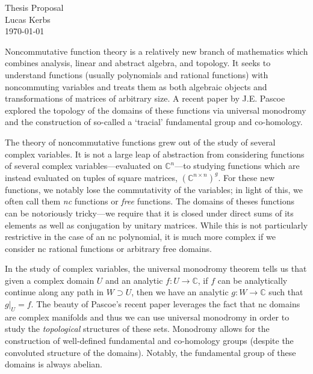 \documentclass[11pt]{exam}
\newcommand{\CC}{\mathbb{C}}
\begin{document}
\begin{center} {\LARGE Thesis Proposal \vspace{2mm}}\\ Lucas Kerbs \\ \today \end{center}

Noncommutative function theory is a relatively new branch of mathematics which
combines analysis, linear and abstract algebra, and topology. It
seeks to understand functions (usually polynomials and rational functions) with
noncommuting variables and treats them as both algebraic objects and transformations
of matrices of arbitrary size. A recent paper by J.E. Pascoe explored the
topology of the domains of these functions via universal monodromy and the
construction of so-called a `tracial' fundamental group and co-homology.

The theory of noncommutative functions grew out of the study of several complex
variables. It is not a large leap of abstraction from considering functions of
several complex variables---evaluated on \(\CC ^n\)---to studying functions
which are instead evaluated on tuples of square matrices,
\(\left(\CC ^{n\times n}\right)^g\). For these new functions, we notably lose the
commutativity of the variables; in light of this, we often call them \emph{nc}
functions or \emph{free} functions. The domains of theses functions can be
notoriously tricky---we require that it is closed under direct sums of its
elements as well as conjugation by unitary matrices. While this is not
particularly restrictive in the case of an nc polynomial, it is much more
complex if we consider nc rational functions or arbitrary free domains.

In the study of complex variables, the universal monodromy theorem tells us that
given a complex domain \(U\) and an analytic \(f: U \to \CC \), if \(f\) can be
analytically continue along any path in \(W\supset U\), then we have an analytic
\(g:W\to \CC \) such that \(\left. g\right|_{U}=f\). The beauty of Pascoe's
recent paper leverages the fact that nc domains are complex manifolds and thus
we can use universal monodromy in order to study the \emph{topological}
structures of these sets. Monodromy allows for the construction of well-defined
fundamental and co-homology groups (despite the convoluted structure of the
domains). Notably, the fundamental group of these domains is always abelian.
\end{document}

